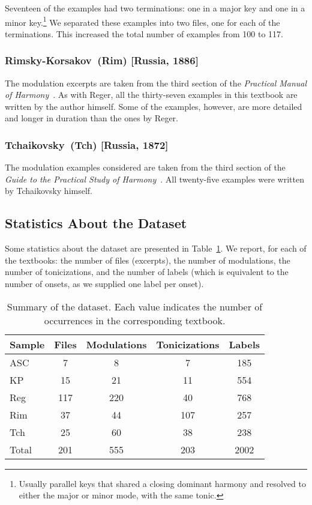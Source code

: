 \documentclass[sigconf]{acmart}
\begin{document}
	Seventeen of the examples had two terminations: one in a major key and one in a minor key.\footnote{Usually parallel keys that shared a closing dominant harmony and resolved to either the major or minor mode, with the same tonic.} 
	We separated these examples into two files, one for each of the terminations.
	This increased the total number of examples from 100 to 117.
	
	\subsubsection{Rimsky-Korsakov~(Rim) [Russia, 1886]}
	The modulation excerpts are taken from the third section of the \emph{Practical Manual of Harmony}~\cite{rimskitonality}. 
	As with Reger, all the thirty-seven examples in this textbook are written by the author himself. 
	Some of the examples, however, are more detailed and longer in duration than the ones by Reger.
	
	\subsubsection{Tchaikovsky~(Tch) [Russia, 1872]}
	The modulation examples considered are taken from the third section of the \emph{Guide to the Practical Study of Harmony}~\cite{tchaikovsky1872guide}.
	All twenty-five examples were written by Tchaikovsky himself.

\subsection{Statistics About the Dataset}\label{ssec:stats}

Some statistics about the dataset are presented in Table~\ref{tab:dataset}. 
We report, for each of the textbooks: the number of files (excerpts), the number of modulations, the number of tonicizations, and the number of labels (which is equivalent to the number of onsets, as we supplied one label per onset).

\begin{table}
  \caption{Summary of the dataset. Each value indicates the number of occurrences in the corresponding textbook.}
  \label{tab:dataset}
  \begin{tabular}{l|cccc}
    \toprule
    Sample & Files & Modulations & Tonicizations & Labels\\
    \midrule
    ASC & 7 & 8 & 7 & 185\\
    KP & 15 & 21 & 11 & 554\\
    Reg & 117 & 220 & 40 & 768\\ 
    Rim & 37 & 44 & 107 & 257\\ 
    Tch & 25 & 60 & 38 & 238\\
    Total & 201 & 555 & 203 & 2002 \\
  \bottomrule
\end{tabular}
\end{table}
\end{document}
